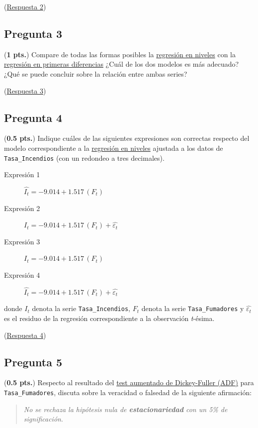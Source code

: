 \documentclass[10pt]{article}
\begin{document}
(\hyperref[sec:org1a04b04]{Respuesta 2})
\subsection*{Pregunta 3}
\label{sec:org8d61215}

(\textbf{1 pts.}) Compare de todas las formas posibles la \hyperref[sec:org1a45e1f]{regresión en niveles} con la \hyperref[sec:org229f929]{regresión en primeras diferencias} ¿Cuál de los dos modelos es más adecuado? ¿Qué se puede concluir sobre la relación entre ambas series?

(\hyperref[sec:orgbbeaf09]{Respuesta 3})
\subsection*{Pregunta 4}
\label{sec:orgb8b2484}

(\textbf{0.5 pts.}) Indique cuáles de las siguientes expresiones son correctas respecto del modelo correspondiente a la \hyperref[sec:org1a45e1f]{regresión en niveles} ajustada a los datos de \texttt{Tasa\_Incendios} (con un redondeo a tres decimales).
\begin{description}
\item[{Expresión 1}] \(\widehat{I_t} = -9.014 + 1.517\, (F_t)\)
\item[{Expresión 2}] \({I_t} = -9.014 + 1.517\, (F_t) +  \widehat{\varepsilon_t}\)
\item[{Expresión 3}] \({I_t} = -9.014 + 1.517\, (F_t)\)
\item[{Expresión 4}] \(\widehat{I_t} = -9.014 + 1.517\, (F_t) + \widehat{\varepsilon_t}\)
\end{description}
donde \(I_t\) denota la serie \texttt{Tasa\_Incendios}, \(F_t\) denota la serie \texttt{Tasa\_Fumadores} y \(\widehat{\varepsilon_t}\) es el residuo de la regresión correspondiente a la observación \emph{t}-ésima.

(\hyperref[sec:orgd2ab241]{Respuesta 4})
\subsection*{Pregunta 5}
\label{sec:org86b0685}

(\textbf{0.5 pts.}) Respecto al resultado del \hyperref[sec:org7cb5c4c]{test aumentado de Dickey-Fuller (ADF)} para \texttt{Tasa\_Fumadores}, discuta sobre la veracidad o falsedad de la siguiente afirmación:
\begin{quote}
\emph{No se rechaza la hipótesis nula de \textbf{estacionariedad} con un 5\% de significación}.
\end{quote}
\end{document}
